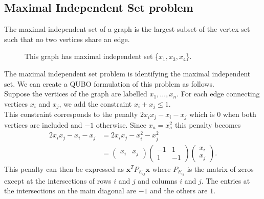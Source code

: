 \documentclass{article}
\begin{document}
\subsection{Maximal Independent Set problem}

\noindent The maximal independent set of a graph is the largest subset of the vertex set such that no two vertices share an edge.

\begin{figure}[H]
    \centering
    \caption{This graph has maximal independent set \{\(x_1, x_3, x_4\)\}.}
\end{figure}

\noindent The maximal independent set problem is identifying the maximal independent set. We can create a QUBO formulation of this problem as follows. \\

\noindent Suppose the vertices of the graph are labelled \(x_1, \dots,  x_n\). For each edge connecting vertices \(x_i\) and \(x_j\), we add the constraint \(x_i + x_j \leq 1\). \\ This constraint corresponds to the penalty \(2x_ix_j - x_i - x_j\) which is \(0\) when both vertices are included and \(-1\) otherwise. Since \(x_a = x_a^2\) this penalty becomes
\begin{align*}
    2x_ix_j - x_i - x_j &= 2x_ix_j - x_i^2 - x_j^2 \\
    &= \begin{pmatrix}
        x_i & x_j
    \end{pmatrix} \begin{pmatrix}
        -1 & 1 \\
         1 & -1 
    \end{pmatrix}
    \begin{pmatrix}
        x_i \\
        x_j
    \end{pmatrix}.
\end{align*}
\noindent This penalty can then be expressed as \(\mathbf{x}^T P_{E_{ij}}\mathbf{x}\) where \(P_{E_{ij}}\) is the matrix of zeros except at the intersections of rows \(i\) and \(j\) and columns \(i\) and \(j\). The entries at the intersections on the main diagonal are \(-1\) and the others are \(1\).\\
\end{document}
